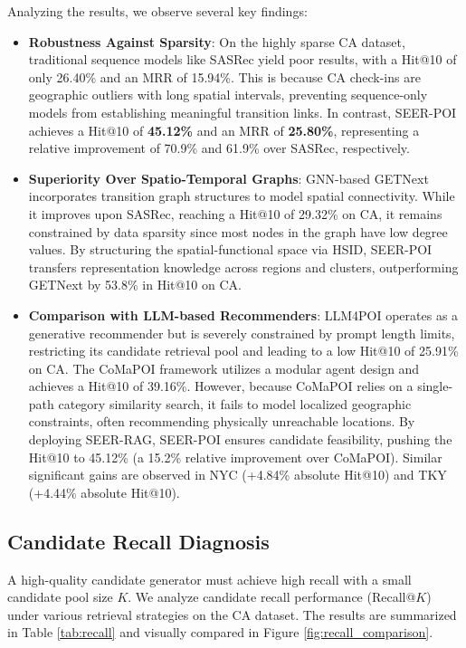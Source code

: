 \documentclass[10pt,twocolumn]{article}
\newcommand{\method}{SEER-POI}
\begin{document}
Analyzing the results, we observe several key findings:
\begin{itemize}
    \item \textbf{Robustness Against Sparsity}: On the highly sparse CA dataset, traditional sequence models like SASRec yield poor results, with a Hit@10 of only 26.40\% and an MRR of 15.94\%. This is because CA check-ins are geographic outliers with long spatial intervals, preventing sequence-only models from establishing meaningful transition links. In contrast, \method{} achieves a Hit@10 of \textbf{45.12\%} and an MRR of \textbf{25.80\%}, representing a relative improvement of 70.9\% and 61.9\% over SASRec, respectively.
    \item \textbf{Superiority Over Spatio-Temporal Graphs}: GNN-based GETNext incorporates transition graph structures to model spatial connectivity. While it improves upon SASRec, reaching a Hit@10 of 29.32\% on CA, it remains constrained by data sparsity since most nodes in the graph have low degree values. By structuring the spatial-functional space via HSID, \method{} transfers representation knowledge across regions and clusters, outperforming GETNext by 53.8\% in Hit@10 on CA.
    \item \textbf{Comparison with LLM-based Recommenders}: LLM4POI operates as a generative recommender but is severely constrained by prompt length limits, restricting its candidate retrieval pool and leading to a low Hit@10 of 25.91\% on CA. The CoMaPOI framework utilizes a modular agent design and achieves a Hit@10 of 39.16\%. However, because CoMaPOI relies on a single-path category similarity search, it fails to model localized geographic constraints, often recommending physically unreachable locations. By deploying SEER-RAG, \method{} ensures candidate feasibility, pushing the Hit@10 to 45.12\% (a 15.2\% relative improvement over CoMaPOI). Similar significant gains are observed in NYC (+4.84\% absolute Hit@10) and TKY (+4.44\% absolute Hit@10).
\end{itemize}

\subsection{Candidate Recall Diagnosis}
A high-quality candidate generator must achieve high recall with a small candidate pool size $K$. We analyze candidate recall performance (Recall@$K$) under various retrieval strategies on the CA dataset. The results are summarized in Table \ref{tab:recall} and visually compared in Figure \ref{fig:recall_comparison}.
\end{document}

